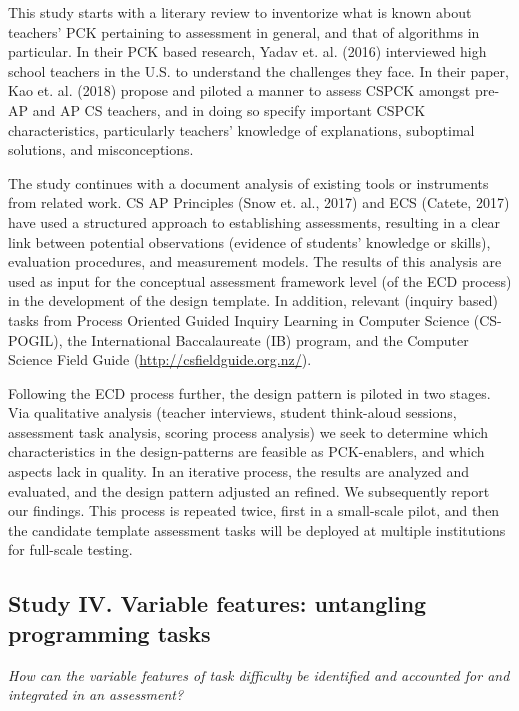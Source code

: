 This study starts with a literary review to inventorize what is known about teachers' PCK pertaining to assessment in general, and that of algorithms in particular. In their PCK based research, Yadav et. al. (2016) interviewed high school teachers in the U.S. to understand the challenges they face. In their paper, Kao et. al. (2018) propose and piloted a manner to assess CSPCK amongst pre-AP and AP CS teachers, and in doing so specify important CSPCK characteristics, particularly teachers' knowledge of explanations, suboptimal solutions, and misconceptions.



The study continues with a document analysis of existing tools or instruments from related work. CS AP Principles (Snow et. al., 2017) and ECS (Catete, 2017) have used a structured approach to establishing assessments, resulting in a clear link between potential observations (evidence of students' knowledge or skills), evaluation procedures, and measurement models. The results of this analysis are used as input for the conceptual assessment framework level (of the ECD process) in the development of the design template. In addition, relevant (inquiry based) tasks from Process Oriented Guided Inquiry Learning in Computer Science (CS-POGIL), the International Baccalaureate (IB) program, and the Computer Science Field Guide (\url{http://csfieldguide.org.nz/}).



Following the ECD process further, the design pattern is piloted in two stages. Via qualitative analysis (teacher interviews, student think-aloud sessions, assessment task analysis, scoring process analysis) we seek to determine which characteristics in the design-patterns are feasible as PCK-enablers, and which aspects lack in quality. In an iterative process, the results are analyzed and evaluated, and the design pattern adjusted an refined. We subsequently report our findings. This process is repeated twice, first in a small-scale pilot, and then the candidate template assessment tasks will be deployed at multiple institutions for full-scale testing.


\subsection{Study IV. Variable features: untangling programming tasks}
\textit{How can the variable features of task difficulty be identified and accounted for and integrated in an assessment?}

